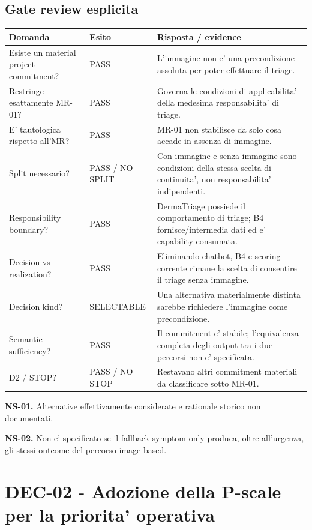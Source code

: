\documentclass[11pt,a4paper]{article}
\begin{document}
\subsection{Gate review esplicita}
\begin{longtable}{L{50mm}L{24mm}L{83mm}}
\toprule
\textbf{Domanda} & \textbf{Esito} & \textbf{Risposta / evidence} \\
\midrule
\endhead
Esiste un material project commitment? & PASS & L'immagine non e' una precondizione assoluta per poter effettuare il triage. \\
Restringe esattamente MR-01? & PASS & Governa le condizioni di applicabilita' della medesima responsabilita' di triage. \\
E' tautologica rispetto all'MR? & PASS & MR-01 non stabilisce da solo cosa accade in assenza di immagine. \\
Split necessario? & PASS / NO SPLIT & Con immagine e senza immagine sono condizioni della stessa scelta di continuita', non responsabilita' indipendenti. \\
Responsibility boundary? & PASS & DermaTriage possiede il comportamento di triage; B4 fornisce/intermedia dati ed e' capability consumata. \\
Decision vs realization? & PASS & Eliminando chatbot, B4 e scoring corrente rimane la scelta di consentire il triage senza immagine. \\
Decision kind? & SELECTABLE & Una alternativa materialmente distinta sarebbe richiedere l'immagine come precondizione. \\
Semantic sufficiency? & PASS & Il commitment e' stabile; l'equivalenza completa degli output tra i due percorsi non e' specificata. \\
D2 / STOP? & PASS / NO STOP & Restavano altri commitment materiali da classificare sotto MR-01. \\
\bottomrule
\end{longtable}

\begin{ddtaopen}[title={DEC-01 - gap preservati}]
\textbf{NS-01.} Alternative effettivamente considerate e rationale storico non documentati.\par
\textbf{NS-02.} Non e' specificato se il fallback symptom-only produca, oltre all'urgenza, gli stessi outcome del percorso image-based.
\end{ddtaopen}

\section{DEC-02 - Adozione della P-scale per la priorita' operativa}
\closedtag
\end{document}
